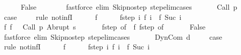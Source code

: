 \begin{isabellebody}
\ \ \ \ \isamarkupfalse%
\ False\isanewline
\ \ \ \ \ \ \isamarkupfalse%
\ {\isacharparenleft}fastforce\ elim{\isacharcolon}\ Skip{\isacharunderscore}no{\isacharunderscore}step\ step{\isacharunderscore}elim{\isacharunderscore}cases{\isacharparenright}\isanewline
\ \ \isamarkupfalse%
\isanewline
{}\isamarkupfalse%
\isanewline
\ \ \isamarkupfalse%
\ {\isacharparenleft}Call\ p{\isacharparenright}\ \isanewline
\ \ \isamarkupfalse%
\ {\isacharquery}case\ \isanewline
\ \ \isamarkupfalse%
\ {\isacharparenleft}rule\ not{\isacharunderscore}infI{\isacharparenright}\isanewline
\ \ \ \ \isamarkupfalse%
\ f\isanewline
\ \ \ \ \isamarkupfalse%
\ f{\isacharunderscore}step{\isacharcolon}\ {\isachardoublequoteopen}{\isasymAnd}i{\isachardot}\ {\isasymGamma}{\isasymturnstile}f\ i\ {\isasymrightarrow}\ f\ {\isacharparenleft}Suc\ i{\isacharparenright}{\isachardoublequoteclose}\isanewline
\ \ \ \ \isamarkupfalse%
\ f{\isacharunderscore}{}{\isacharcolon}\ {\isachardoublequoteopen}f\ {}\ {\isacharequal}\ {\isacharparenleft}Call\ p{\isacharcomma}\ Abrupt\ s{\isacharparenright}{\isachardoublequoteclose}\ \isanewline
\ \ \ \ \isamarkupfalse%
\ f{\isacharunderscore}step\ {\isacharbrackleft}of\ {}{\isacharbrackright}\ f{\isacharunderscore}{}\ f{\isacharunderscore}step\ {\isacharbrackleft}of\ {}{\isacharbrackright}\isanewline
\ \ \ \ \isamarkupfalse%
\ False\isanewline
\ \ \ \ \ \ \isamarkupfalse%
\ {\isacharparenleft}fastforce\ elim{\isacharcolon}\ Skip{\isacharunderscore}no{\isacharunderscore}step\ step{\isacharunderscore}elim{\isacharunderscore}cases{\isacharparenright}\isanewline
\ \ \isamarkupfalse%
\isanewline
{}\isamarkupfalse%
\isanewline
\ \ \isamarkupfalse%
\ {\isacharparenleft}DynCom\ d{\isacharparenright}\ \isanewline
\ \ \isamarkupfalse%
\ {\isacharquery}case\ \isanewline
\ \ \isamarkupfalse%
\ {\isacharparenleft}rule\ not{\isacharunderscore}infI{\isacharparenright}\isanewline
\ \ \ \ \isamarkupfalse%
\ f\isanewline
\ \ \ \ \isamarkupfalse%
\ f{\isacharunderscore}step{\isacharcolon}\ {\isachardoublequoteopen}{\isasymAnd}i{\isachardot}\ {\isasymGamma}{\isasymturnstile}f\ i\ {\isasymrightarrow}\ f\ {\isacharparenleft}Suc\ i{\isacharparenright}{\isachardoublequoteclose}\isanewline
\ \ \ \ \isamarkupfalse%

\end{isabellebody}
